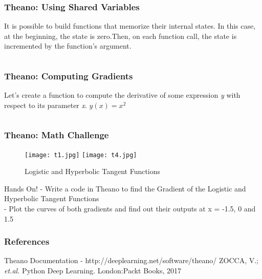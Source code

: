 \documentclass[aspectratio=169]{beamer}
\begin{document}
\begin{frame}
\frametitle{Theano: Using Shared Variables}
It is possible to build functions that memorize their internal states. In this case, at the beginning, the state is  zero.Then, on each function call, the state is incremented by the function’s argument.
\inputminted{python}{t9.py}
\end{frame}

\begin{frame}
\frametitle{Theano: Computing Gradients }
Let's create a function to compute the derivative of some expression  \textit{y} with respect to its parameter \textit{x}.
$y(x) = x^{2}$
\inputminted{python}{t10.py}
\end{frame}

\begin{frame}
\frametitle{Theano: Math Challenge}
\begin{figure}
\texttt{[image: t1.jpg]}
\texttt{[image: t4.jpg]}
\caption{Logistic and Hyperbolic Tangent Functions}
\label{fig:Logistic and tanh Functions}
\end{figure}
Hands On! - Write a code in Theano to find the Gradient of the Logistic and Hyperbolic Tangent Functions
\\[0.3cm] - Plot the curves of both gradients and find out their outputs at x = -1.5, 0 and 1.5
\end{frame}

\begin{frame}
\frametitle{References}
\footnotesize{
\begin{thebibliography}{99}
 Theano  Documentation - http://deeplearning.net/software/theano/
 ZOCCA, V.; \textit{et.al.} Python Deep Learning. London:Packt Books, 2017


\end{thebibliography}
}
\end{frame}
\end{document}
